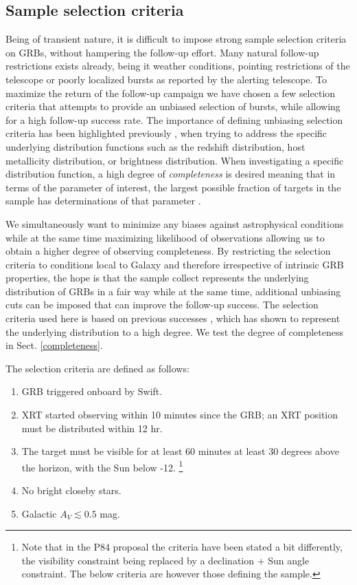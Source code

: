 \documentclass{aa}    %
\begin{document}
\subsection{Sample selection criteria} \label{samplecrit}

Being of transient nature, it is difficult to impose strong sample selection
criteria on GRBs, without hampering the follow-up effort. Many natural follow-up
restrictions exists already, being it weather conditions, pointing restrictions
of the telescope or poorly localized bursts as reported by the alerting
telescope. To maximize the return of the follow-up campaign we have chosen a few
selection criteria that attempts to provide an unbiased selection of bursts,
while allowing for a high follow-up success rate. The importance of defining
unbiasing selection criteria has been highlighted previously
\citep{Salvaterra2012, Hjorth2012, Vergani2015, Perley2016a}, when trying to
address the specific underlying distribution functions such as the redshift
distribution, host metallicity distribution, or brightness distribution. When
investigating a specific distribution function, a high degree of
\textit{completeness} is desired meaning that in terms of the parameter of
interest, the largest possible fraction of targets in the sample has
determinations of that parameter \citep{Perley2016b}.

We simultaneously want to minimize any biases against astrophysical conditions
while at the same time maximizing likelihood of observations allowing us to
obtain a higher degree of observing completeness. By restricting the selection
criteria to conditions local to Galaxy and therefore irrespective of intrinsic
GRB properties, the hope is that the sample collect represents the underlying
distribution of GRBs in a fair way while at the same time, additional unbiasing
cuts can be imposed that can improve the follow-up success. The selection
criteria used here is based on previous successes \cite{Jakobsson2006b,
	Fynbo2009, Hjorth2012}, which has shown to represent the underlying distribution
to a high degree. We test the degree of completeness in Sect.
\ref{completeness}.

The selection criteria are defined as follows:

\begin{enumerate}
	\item GRB triggered onboard by Swift.
	\item XRT started observing within 10 minutes since the GRB; an XRT position must be distributed within 12 hr.
	\item The target must be visible for at least 60 minutes at least 30 degrees above the horizon, with the Sun below -12.
	\footnote{Note that in the P84 proposal the criteria have
	been stated a bit differently, the visibility constraint being replaced by a
	declination + Sun angle constraint. The below criteria are however those
	defining the sample.}
	\item No bright closeby stars.
	\item Galactic $A_V \lesssim 0.5$ mag.
\end{enumerate}
\end{document}
